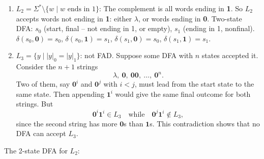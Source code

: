 \documentclass[11pt,openany]{book}
\begin{document}
\begin{enumerate}[{1.}1.]
\begin{enumerate}
\begin{center}
\end{center}

\item $L_2 = \Sigma^* \setminus \{w \mid w \text{ ends in }1\}$: The complement is all words ending in \textbf{1}. So $L_2$ accepts words not ending in \textbf{1}: either $\lambda$, or words ending in \textbf{0}. Two-state DFA: $s_0$ (start, final -- not ending in 1, or empty), $s_1$ (ending in 1, nonfinal). $\delta(s_0,\mathbf{0})=s_0$, $\delta(s_0,\mathbf{1})=s_1$, $\delta(s_1,\mathbf{0})=s_0$, $\delta(s_1,\mathbf{1})=s_1$.

\item $L_3 = \{y \mid |y|_0 = |y|_1\}$: not FAD. Suppose some DFA with $n$ states accepted it. Consider the $n+1$ strings
\[
\lambda,\ \pmb{0},\ \pmb{00},\ \ldots,\ \pmb{0}^n.
\]
Two of them, say $\pmb{0}^i$ and $\pmb{0}^j$ with $i<j$, must lead from the start state to the same state. Then appending $\pmb{1}^i$ would give the same final outcome for both strings. But
\[
\pmb{0}^i\pmb{1}^i \in L_3
\quad\text{while}\quad
\pmb{0}^j\pmb{1}^i \notin L_3,
\]
since the second string has more $\pmb{0}$s than $\pmb{1}$s. This contradiction shows that no DFA can accept $L_3$.
\end{enumerate}

The 2-state DFA for $L_2$:

\begin{center}
\end{center}


\end{enumerate}
\end{document}
